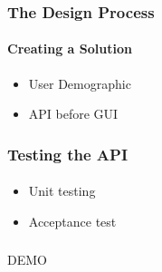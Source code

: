\begin{frame}
    \frametitle{The Design Process}
    \framesubtitle{Creating a Solution}
    \begin{itemize}
    	\item User Demographic
    	\item API before GUI
    \end{itemize}
\end{frame}


\begin{frame}
    \frametitle{Testing the API}
    \framesubtitle{}
    \begin{itemize}
    	\item Unit testing
    	\item Acceptance test
    \end{itemize}
\end{frame}

\begin{frame}
  \frametitle{}
  \begin{center}
    {\Huge DEMO}
  \end{center}
\end{frame}

